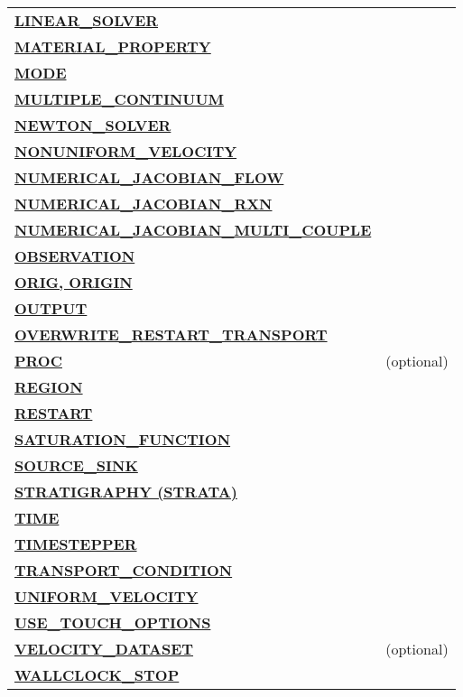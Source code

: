 \begin{longtable}{ll}
\hyperlink{target_linsolv}{\bf LINEAR\_SOLVER} & \\
\hyperlink{target_mat}{\bf MATERIAL\_PROPERTY} & \\
\hyperlink{target_mode}{\bf MODE} & \\
\hyperlink{target_mc}{\bf MULTIPLE\_CONTINUUM} & \\
\hyperlink{target_newt}{\bf NEWTON\_SOLVER} & \\
\hyperlink{target_nonuniform_vel}{\bf NONUNIFORM\_VELOCITY} & \\ 
\hyperlink{target_numjac_flow}{\bf NUMERICAL\_JACOBIAN\_FLOW} & \\
\hyperlink{target_numjac_rxn}{\bf NUMERICAL\_JACOBIAN\_RXN} & \\
\hyperlink{target_numjac_multi}{\bf NUMERICAL\_JACOBIAN\_MULTI\_COUPLE} & \\
\hyperlink{target_observation}{\bf OBSERVATION} & \\
\hyperlink{target_orig}{\bf ORIG, ORIGIN} & \\
\hyperlink{target_output}{\bf OUTPUT} & \\
\hyperlink{target_overwrite}{\bf OVERWRITE\_RESTART\_TRANSPORT} & \\
\hyperlink{target_proc}{\bf PROC} & (optional)\\
\hyperlink{target_region}{\bf REGION} & \\
\hyperlink{target_restart}{\bf RESTART} & \\
\hyperlink{target_sat}{\bf SATURATION\_FUNCTION} & \\
\hyperlink{target_src}{\bf SOURCE\_SINK} & \\
\hyperlink{target_strata}{\bf STRATIGRAPHY (STRATA)} & \\
\hyperlink{target_time}{\bf TIME} & \\
\hyperlink{target_timestep}{\bf TIMESTEPPER} & \\
\hyperlink{target_trans_cond}{\bf TRANSPORT\_CONDITION} & \\
\hyperlink{target_unifvel}{\bf UNIFORM\_VELOCITY} & \\
\hyperlink{target_touch}{\bf USE\_TOUCH\_OPTIONS} & \\
\hyperlink{target_veldata}{\bf VELOCITY\_DATASET} & (optional) \\
\hyperlink{target_wallclk}{\bf WALLCLOCK\_STOP} & \\
\bottomrule[1.5pt]
\end{longtable}


